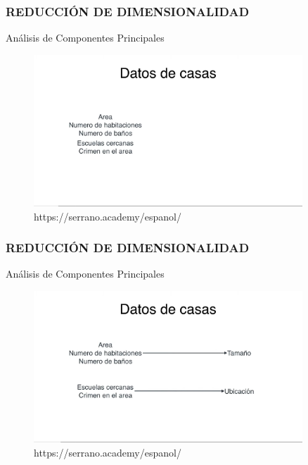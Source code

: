 \documentclass{beamer}
\begin{document}
\begin{frame}
	\frametitle{REDUCCIÓN DE DIMENSIONALIDAD}
	\begin{block}{Análisis de Componentes Principales}	
		\begin{figure}
			\includegraphics[width=0.9\textwidth]{PCA/IMG_3535.jpg}
			\caption{https://serrano.academy/espanol/}
		\end{figure}
	\end{block}
\end{frame}

\begin{frame}
	\frametitle{REDUCCIÓN DE DIMENSIONALIDAD}
	\begin{block}{Análisis de Componentes Principales}	
		\begin{figure}
			\includegraphics[width=0.9\textwidth]{PCA/IMG_3536.jpg}
			\caption{https://serrano.academy/espanol/}
		\end{figure}
	\end{block}
\end{frame}
\end{document}
